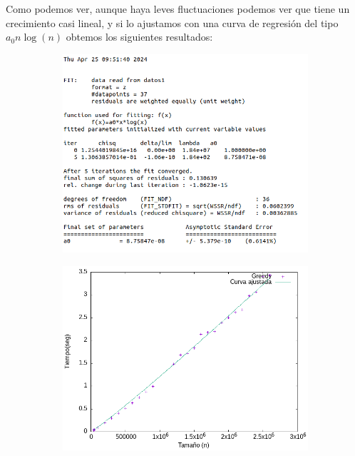 \documentclass{article}
\begin{document}
    Como podemos ver, aunque haya leves fluctuaciones podemos ver que tiene un crecimiento casi lineal, y si lo ajustamos con una curva de 
    regresión del tipo $a_0 n \log (n)$ obtemos los siguientes resultados: 

    \begin{figure}[H]
    \begin{subfigure}{0.4\textwidth}
        \centering
        \includegraphics[scale = 0.40]{Problema2/imagenes/fitLog.png}
    \end{subfigure} \hfill
    \begin{subfigure}{0.4\textwidth}
        \centering
        \includegraphics[scale = 0.40]{Problema2/imagenes/Salida_ajustada1.jpeg}
    \end{subfigure}
    \end{figure}
\end{document}
